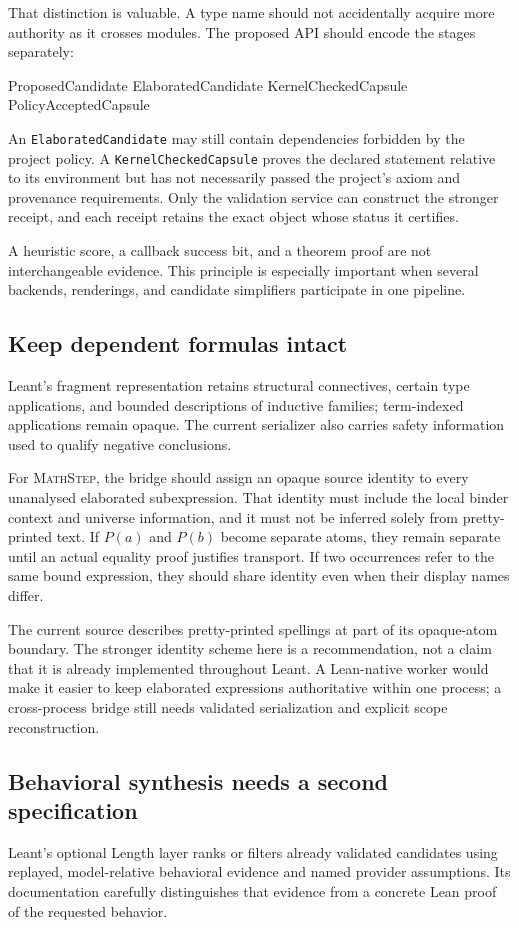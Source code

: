 \documentclass[11pt,a4paper]{article}
\theoremstyle{remark}
\newcommand{\ms}{\textsc{MathStep}}
\newcommand{\ty}[1]{\texttt{#1}}
\begin{document}
That distinction is valuable. A type name should not accidentally acquire more authority as it crosses modules. The proposed API should encode the stages separately:
\Needspace{70pt}
\begin{code}
ProposedCandidate
ElaboratedCandidate
KernelCheckedCapsule
PolicyAcceptedCapsule
\end{code}
An \ty{ElaboratedCandidate} may still contain dependencies forbidden by the project policy. A \ty{KernelCheckedCapsule} proves the declared statement relative to its environment but has not necessarily passed the project's axiom and provenance requirements. Only the validation service can construct the stronger receipt, and each receipt retains the exact object whose status it certifies.

A heuristic score, a callback success bit, and a theorem proof are not interchangeable evidence. This principle is especially important when several backends, renderings, and candidate simplifiers participate in one pipeline.

\subsection{Keep dependent formulas intact}
Leant's fragment representation retains structural connectives, certain type applications, and bounded descriptions of inductive families; term-indexed applications remain opaque. The current serializer also carries safety information used to qualify negative conclusions.\cite{leant-fragment}

For \ms, the bridge should assign an opaque source identity to every unanalysed elaborated subexpression. That identity must include the local binder context and universe information, and it must not be inferred solely from pretty-printed text. If $P(a)$ and $P(b)$ become separate atoms, they remain separate until an actual equality proof justifies transport. If two occurrences refer to the same bound expression, they should share identity even when their display names differ.

The current source describes pretty-printed spellings at part of its opaque-atom boundary. The stronger identity scheme here is a recommendation, not a claim that it is already implemented throughout Leant. A Lean-native worker would make it easier to keep elaborated expressions authoritative within one process; a cross-process bridge still needs validated serialization and explicit scope reconstruction.

\subsection{Behavioral synthesis needs a second specification}
Leant's optional Length layer ranks or filters already validated candidates using replayed, model-relative behavioral evidence and named provider assumptions. Its documentation carefully distinguishes that evidence from a concrete Lean proof of the requested behavior.\cite{leant-internals,leant-readme}
\end{document}
